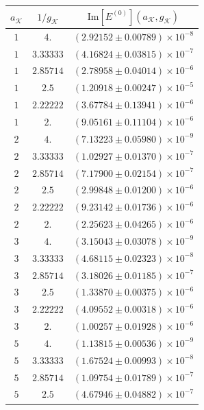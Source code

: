 \documentclass[english,aps,prd,nofootinbib,twocolumn]{revtex4-1}
\begin{document}
\begin{table}
\begin{tabular}{ccc}
$a_{\mathcal{K}}$	&	$1/g_{\mathcal{K}}$	&	
$\mathrm{Im}[E^{(0)}](a_{\mathcal{K}},g_{\mathcal{K}})$	\\ \hline \hline 
$ 1 $ & $ 4.      $ & $ (2.92152\pm0.00789)\times 10^{-8}$ \\
$ 1 $ & $ 3.33333 $ & $ (4.16824\pm0.03815)\times 10^{-7}$ \\
$ 1 $ & $ 2.85714 $ & $ (2.78958\pm0.04014)\times 10^{-6}$ \\
$ 1 $ & $ 2.5     $ & $ (1.20918\pm0.00247)\times 10^{-5}$ \\
$ 1 $ & $ 2.22222 $ & $ (3.67784\pm0.13941)\times 10^{-6}$ \\
$ 1 $ & $ 2.      $ & $ (9.05161\pm0.11104)\times 10^{-6}$ \\ \hline \hline 
$ 2 $ & $ 4.      $ & $ (7.13223\pm0.05980)\times 10^{-9}$ \\
$ 2 $ & $ 3.33333 $ & $ (1.02927\pm0.01370)\times 10^{-7}$ \\
$ 2 $ & $ 2.85714 $ & $ (7.17900\pm0.02154)\times 10^{-7}$ \\
$ 2 $ & $ 2.5     $ & $ (2.99848\pm0.01200)\times 10^{-6}$ \\
$ 2 $ & $ 2.22222 $ & $ (9.23142\pm0.01736)\times 10^{-6}$ \\
$ 2 $ & $ 2.      $ & $ (2.25623\pm0.04265)\times 10^{-6}$ \\ \hline \hline 
$ 3 $ & $ 4.      $ & $ (3.15043\pm0.03078)\times 10^{-9}$ \\
$ 3 $ & $ 3.33333 $ & $ (4.68115\pm0.02323)\times 10^{-8}$ \\
$ 3 $ & $ 2.85714 $ & $ (3.18026\pm0.01185)\times 10^{-7}$ \\
$ 3 $ & $ 2.5     $ & $ (1.33870\pm0.00375)\times 10^{-6}$ \\
$ 3 $ & $ 2.22222 $ & $ (4.09552\pm0.00318)\times 10^{-6}$ \\
$ 3 $ & $ 2.      $ & $ (1.00257\pm0.01928)\times 10^{-6}$ \\ \hline \hline 
$ 5 $ & $ 4.      $ & $ (1.13815\pm0.00536)\times 10^{-9}$ \\
$ 5 $ & $ 3.33333 $ & $ (1.67524\pm0.00993)\times 10^{-8}$ \\
$ 5 $ & $ 2.85714 $ & $ (1.09754\pm0.01789)\times 10^{-7}$ \\
$ 5 $ & $ 2.5     $ & $ (4.67946\pm0.04882)\times 10^{-7}$ \\

\end{tabular}
\end{table}
\end{document}
